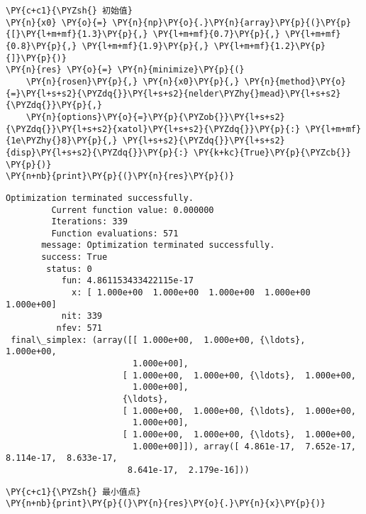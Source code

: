     \begin{tcolorbox}[breakable, size=fbox, boxrule=1pt, pad at break*=1mm,colback=cellbackground, colframe=cellborder]
\begin{Verbatim}[commandchars=\\\{\}]
\PY{c+c1}{\PYZsh{} 初始值}
\PY{n}{x0} \PY{o}{=} \PY{n}{np}\PY{o}{.}\PY{n}{array}\PY{p}{(}\PY{p}{[}\PY{l+m+mf}{1.3}\PY{p}{,} \PY{l+m+mf}{0.7}\PY{p}{,} \PY{l+m+mf}{0.8}\PY{p}{,} \PY{l+m+mf}{1.9}\PY{p}{,} \PY{l+m+mf}{1.2}\PY{p}{]}\PY{p}{)}
\PY{n}{res} \PY{o}{=} \PY{n}{minimize}\PY{p}{(}
    \PY{n}{rosen}\PY{p}{,} \PY{n}{x0}\PY{p}{,} \PY{n}{method}\PY{o}{=}\PY{l+s+s2}{\PYZdq{}}\PY{l+s+s2}{nelder\PYZhy{}mead}\PY{l+s+s2}{\PYZdq{}}\PY{p}{,}
    \PY{n}{options}\PY{o}{=}\PY{p}{\PYZob{}}\PY{l+s+s2}{\PYZdq{}}\PY{l+s+s2}{xatol}\PY{l+s+s2}{\PYZdq{}}\PY{p}{:} \PY{l+m+mf}{1e\PYZhy{}8}\PY{p}{,} \PY{l+s+s2}{\PYZdq{}}\PY{l+s+s2}{disp}\PY{l+s+s2}{\PYZdq{}}\PY{p}{:} \PY{k+kc}{True}\PY{p}{\PYZcb{}}
\PY{p}{)}
\PY{n+nb}{print}\PY{p}{(}\PY{n}{res}\PY{p}{)}
\end{Verbatim}
\end{tcolorbox}

    \begin{Verbatim}[commandchars=\\\{\}]
Optimization terminated successfully.
         Current function value: 0.000000
         Iterations: 339
         Function evaluations: 571
       message: Optimization terminated successfully.
       success: True
        status: 0
           fun: 4.861153433422115e-17
             x: [ 1.000e+00  1.000e+00  1.000e+00  1.000e+00  1.000e+00]
           nit: 339
          nfev: 571
 final\_simplex: (array([[ 1.000e+00,  1.000e+00, {\ldots},  1.000e+00,
                         1.000e+00],
                       [ 1.000e+00,  1.000e+00, {\ldots},  1.000e+00,
                         1.000e+00],
                       {\ldots},
                       [ 1.000e+00,  1.000e+00, {\ldots},  1.000e+00,
                         1.000e+00],
                       [ 1.000e+00,  1.000e+00, {\ldots},  1.000e+00,
                         1.000e+00]]), array([ 4.861e-17,  7.652e-17,
8.114e-17,  8.633e-17,
                        8.641e-17,  2.179e-16]))
    \end{Verbatim}

    \begin{tcolorbox}[breakable, size=fbox, boxrule=1pt, pad at break*=1mm,colback=cellbackground, colframe=cellborder]
\begin{Verbatim}[commandchars=\\\{\}]
\PY{c+c1}{\PYZsh{} 最小值点}
\PY{n+nb}{print}\PY{p}{(}\PY{n}{res}\PY{o}{.}\PY{n}{x}\PY{p}{)}
\end{Verbatim}
\end{tcolorbox}

